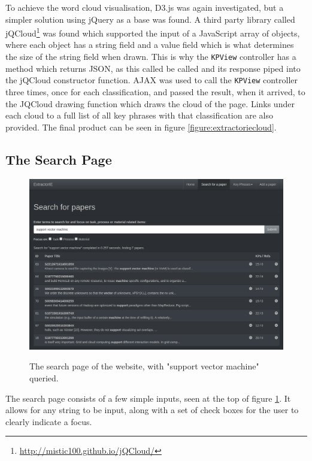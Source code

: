 To achieve the word cloud visualisation, D3.js was again investigated, but a simpler solution using jQuery as a base was found. A third party library called jQCloud\footnote{\href{http://mistic100.github.io/jQCloud/}{http://mistic100.github.io/jQCloud/}} was found which supported the input of a JavaScript array of objects, where each object has a string field and a value field which is what determines the size of the string field when drawn. This is why the \texttt{KPView} controller has a method which returns JSON, as this called be called and its response piped into the jQCloud constructor function. AJAX was used to call the \texttt{KPView} controller three times, once for each classification, and passed the result, when it arrived, to the JQCloud drawing function which draws the cloud of the page. Links under each cloud to a full list of all key phrases with that classification are also provided. The final product can be seen in figure \ref{figure:extractoriecloud}.

\subsection*{The Search Page}

\begin{figure}
	\centering
	\includegraphics[width=12cm]{img/extractorie-search-supportvectormachine.png} \\
	\caption[An example search of the website]{The search page of the website, with "support vector machine" queried.}
	\label{figure:extractoriesearch}
\end{figure}

The search page consists of a few simple inputs, seen at the top of figure \ref{figure:extractoriesearch}. It allows for any string to be input, along with a set of check boxes for the user to clearly indicate a focus.

